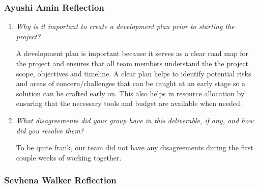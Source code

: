 \documentclass{article}
\begin{document}
\subsubsection*{Ayushi Amin Reflection}

\begin{enumerate}
  \item \textit{Why is it important to create a development plan
      prior to starting the
    project?}

    A development plan is important because it serves as a clear road
    map for the project and ensures that all
    team members understand the the project scope, objectives and
    timeline. A clear plan helps to identify potential risks
    and areas of concern/challenges that can be caught at an early
    stage so a solution can be crafted early on. This also helps
    in resource allocation by ensuring that the necessary tools and
    budget are available when needed.

  \item \textit{What disagreements did your group have in this
    deliverable, if any, and how did you resolve them?}

    To be quite frank, our team did not have any disagreements during
    the first couple weeks of working together.

\end{enumerate}

\subsubsection*{Sevhena Walker Reflection}
\end{document}
